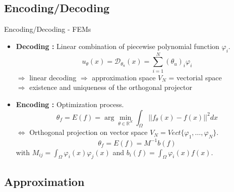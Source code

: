 \subsection{Encoding/Decoding}

\begin{frame}{Encoding/Decoding - FEMs}
	\begin{itemize}[\textbullet]
		\item \textbf{Decoding :} Linear combination of piecewise polynomial function $\varphi_i$.
		\begin{equation*}
			u_\theta(x)=\mathcal{D}_{\theta_u}(x) = \sum_{i=1}^{N}(\theta_u)_i\varphi_i
		\end{equation*}
		$\Rightarrow$ linear decoding $\Rightarrow$ approximation space $V_N$ = vectorial space \\
		$\Rightarrow$ existence and uniqueness of the orthogonal projector
		\item \textbf{Encoding :} Optimization process.
		\begin{equation*}
			\theta_f=E(f)=\arg\min_{\theta\in\mathbb{R}^N}\int_\Omega ||f_\theta(x)-f(x)||^2 dx
		\end{equation*}
		$\Leftrightarrow$ Orthogonal projection on vector space $V_N=Vect\{\varphi_1,\dots,\varphi_N\}$.
		\begin{equation*}
			\theta_f=E(f)=M^{-1}b(f)
		\end{equation*}
		with $M_{ij}=\int_\Omega \varphi_i(x)\varphi_j(x)$ and $b_i(f)=\int_\Omega \varphi_i(x)f(x)$.  
	\end{itemize}
\end{frame}

\subsection{Approximation}

